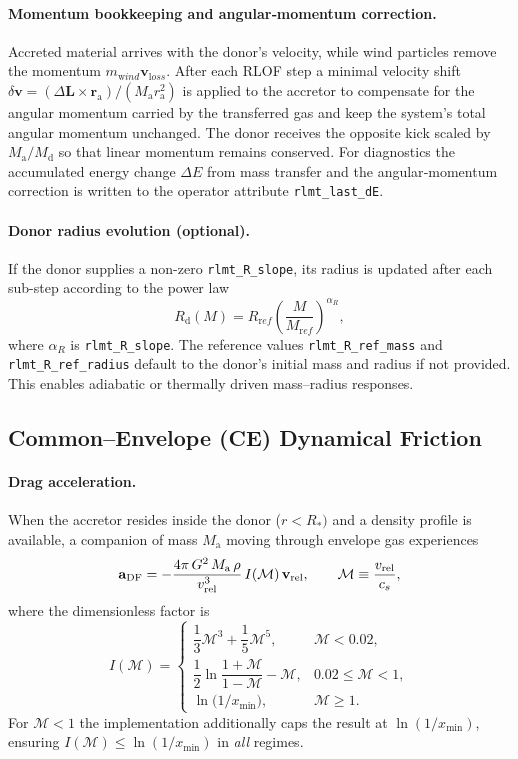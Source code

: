 \documentclass[11pt]{article}
\begin{document}
\paragraph{Momentum bookkeeping and angular‑momentum correction.}
Accreted material arrives with the donor’s velocity, while wind
particles remove the momentum $m_{\mathrm wind}\mathbf v_{\mathrm loss}$.
After each RLOF step a minimal
velocity shift
\(
\delta\mathbf v=(\Delta\mathbf L\times\mathbf r_{\mathrm a})/(M_{\mathrm a}r_{\mathrm a}^2)
\)
is applied to the accretor to compensate for the angular momentum carried by
the transferred gas and keep the system’s total angular momentum unchanged.
The donor receives the opposite kick scaled by $M_{\mathrm a}/M_{\mathrm d}$ so
that linear momentum remains conserved. For diagnostics the accumulated
energy change $\Delta E$ from mass transfer and the angular‑momentum
correction is written to the operator attribute \texttt{rlmt\_last\_dE}.

\paragraph{Donor radius evolution (optional).}
If the donor supplies a non-zero \texttt{rlmt\_R\_slope}, its radius is updated
after each sub-step according to the power law
\[
R_{\mathrm d}(M)=R_{\mathrm ref}
\left(\frac{M}{M_{\mathrm ref}}\right)^{\alpha_R},
\]
where $\alpha_R$ is \texttt{rlmt\_R\_slope}. The reference values
\texttt{rlmt\_R\_ref\_mass} and \texttt{rlmt\_R\_ref\_radius} default to the
donor's initial mass and radius if not provided. This enables adiabatic or
thermally driven mass–radius responses.

\subsection{Common–Envelope (CE) Dynamical Friction}
\label{sec:ce_drag}

\paragraph{Drag acceleration.}
When the accretor resides inside the donor ($r<R_*)$ and a density profile is
available, a companion of mass $M_{\mathrm a}$ moving through envelope gas
experiences
\[
\mathbf a_{\rm DF}=
-\frac{4\pi\,G^2\,M_{\mathrm a}\,\rho}{v_{\rm rel}^3}\,
   I(\mathcal M)\,\mathbf v_{\rm rel},
\qquad
\mathcal M\equiv\frac{v_{\rm rel}}{c_s},
\]
where the dimensionless factor is
\begin{equation}
I(\mathcal M)=
\begin{cases}
\dfrac{1}{3}\mathcal M^3+\dfrac{1}{5}\mathcal M^5,&\mathcal M<0.02,\\[0.6em]
\dfrac{1}{2}\ln\!\dfrac{1+\mathcal M}{1-\mathcal M}-\mathcal M,
 & 0.02\le\mathcal M<1,\\[0.6em]
\ln\!\bigl(1/x_{\min}\bigr),&\mathcal M\ge1.
\end{cases}
\label{eq:I_prefactor}
\end{equation}
For $\mathcal M<1$ the implementation additionally caps the result at
$\ln(1/x_{\min})$,
ensuring $I(\mathcal M)\le\ln(1/x_{\min})$ in \emph{all} regimes.
\end{document}
